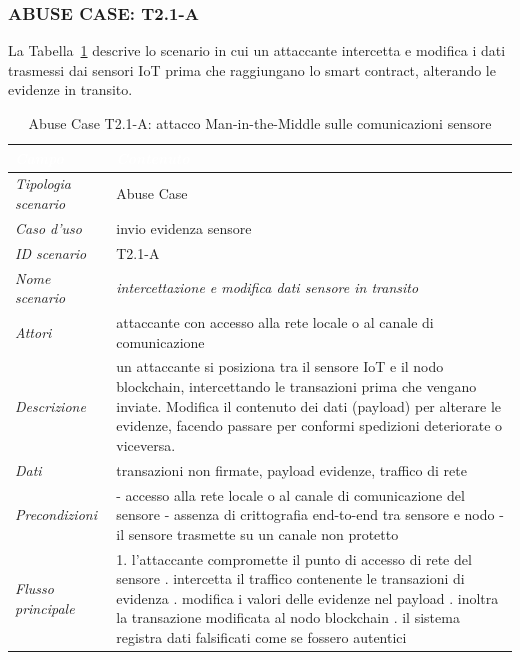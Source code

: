\subsubsection*{ABUSE CASE: T2.1-A}
La Tabella~\ref{tab:t21a} descrive lo scenario in cui un attaccante intercetta e modifica i dati trasmessi dai sensori IoT prima che raggiungano lo smart contract, alterando le evidenze in transito.
\begin{longtable}{| >{\columncolor{abuseCol}}p{} | p{} |}
\caption{Abuse Case T2.1-A: attacco Man-in-the-Middle sulle comunicazioni sensore}\label{tab:t21a}\\
\hline
\rowcolor{abuseHeader} \textcolor{white}{\textit{Campo}} & \textcolor{white}{\textit{Contenuto}} \\
\hline
\textit{Tipologia scenario} & Abuse Case \\
\hline
\textit{Caso d'uso} & invio evidenza sensore \\
\hline
\textit{ID scenario} & T2.1-A \\
\hline
\textit{Nome scenario} & \textit{intercettazione e modifica dati sensore in transito} \\
\hline
\textit{Attori} & attaccante con accesso alla rete locale o al canale di comunicazione \\
\hline
\textit{Descrizione} & un attaccante si posiziona tra il sensore IoT e il nodo blockchain, intercettando le transazioni prima che vengano inviate. Modifica il contenuto dei dati (payload) per alterare le evidenze, facendo passare per conformi spedizioni deteriorate o viceversa. \\
\hline
\textit{Dati} & transazioni non firmate, payload evidenze, traffico di rete \\
\hline
\textit{Precondizioni} & - accesso alla rete locale o al canale di comunicazione del sensore \newline - assenza di crittografia end-to-end tra sensore e nodo \newline - il sensore trasmette su un canale non protetto \\
\hline
\textit{Flusso principale} & 1. l'attaccante compromette il punto di accesso di rete del sensore \newline 2. intercetta il traffico contenente le transazioni di evidenza \newline 3. modifica i valori delle evidenze nel payload \newline 4. inoltra la transazione modificata al nodo blockchain \newline 5. il sistema registra dati falsificati come se fossero autentici \\

\end{longtable}
